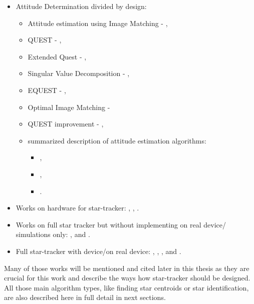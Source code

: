 \documentclass[12pt,a4paper,twoside]{article}
\begin{document}
\begin{itemize}[noitemsep]
\item Attitude Determination divided by design: 
\begin{itemize}[noitemsep]
\item Attitude estimation using Image Matching - \citet{delabie2012highly}, 
\item QUEST - \citet{shuster1990kalman}, 
\item Extended Quest - \citet{psiaki1999extended}, 
\item Singular Value Decomposition - \citet{juang2003efficient},
\item EQUEST - \citet{rinnan2012development}, 
\item Optimal Image Matching - \citet{delabie2012highly}
\item QUEST improvement - \citet{cheng2014improvement}, 
\item summarized description of attitude estimation algorithms: 
\begin{itemize}[noitemsep]
\item \citet{markley1999estimate},
\item \citet{hall2003spacecraft},
\item \citet{tappe2009development}.
\end{itemize}
\end{itemize}

\item Works on hardware for star-tracker: \citet{felikson2011orbit}, \citet{azizabadi2014vlsi}, \citet{gaska2016obc}.

\item Works on full star tracker but without implementing on real device/ simulations only: \citet{huffman2006designing}, \citet{diaz2006performance} and \citet{kandiyil2010attitude}.

\item Full star-tracker with device/on real device: \citet{mortari2002starnav}, \citet{rose2003star}, \citet{cannata2007autonomous}, \citet{lizy2010str} and \citet{jalabert2011optimization}.

\end{itemize}

Many of those works will be mentioned and cited later in this thesis as they are crucial for this work and describe the ways how star-tracker should be designed. All those main algorithm types, like finding star centroids or star identification, are also described here in full detail in next sections.
\end{document}
